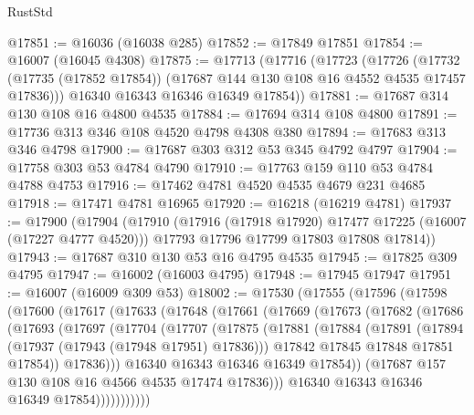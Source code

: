 \begin{lexlean}{RustStd}
\begin{coremodule}
@17851 := @16036 (@16038 @285)
@17852 := @17849 @17851
@17854 := @16007 (@16045 @4308)
@17875 := @17713
    (@17716
      (@17723
        (@17726
          (@17732 (@17735 (@17852 @17854)) (@17687 @144 @130 @108 @16 @4552 @4535 @17457 @17836)))
        @16340
        @16343
        @16346
        @16349
        @17854))
@17881 := @17687 @314 @130 @108 @16 @4800 @4535
@17884 := @17694 @314 @108 @4800
@17891 := @17736 @313 @346 @108 @4520 @4798 @4308 @380
@17894 := @17683 @313 @346 @4798
@17900 := @17687 @303 @312 @53 @345 @4792 @4797
@17904 := @17758 @303 @53 @4784 @4790
@17910 := @17763 @159 @110 @53 @4784 @4788 @4753
@17916 := @17462 @4781 @4520 @4535 @4679 @231 @4685
@17918 := @17471 @4781 @16965
@17920 := @16218 (@16219 @4781)
@17937 := @17900
    (@17904
      (@17910
        (@17916 (@17918 @17920) @17477 @17225 (@16007 (@17227 @4777 @4520)))
        @17793
        @17796
        @17799
        @17803
        @17808
        @17814))
@17943 := @17687 @310 @130 @53 @16 @4795 @4535
@17945 := @17825 @309 @4795
@17947 := @16002 (@16003 @4795)
@17948 := @17945 @17947
@17951 := @16007 (@16009 @309 @53)
@18002 := @17530
    (@17555
      (@17596
        (@17598
          (@17600
            (@17617
              (@17633
                (@17648
                  (@17661
                    (@17669
                      (@17673
                        (@17682
                          (@17686
                            (@17693
                              (@17697
                                (@17704
                                  (@17707
                                    (@17875
                                      (@17881
                                        (@17884
                                          (@17891
                                            (@17894 (@17937 (@17943 (@17948 @17951) @17836)))
                                            @17842
                                            @17845
                                            @17848
                                            @17851
                                            @17854))
                                        @17836)))
                                  @16340
                                  @16343
                                  @16346
                                  @16349
                                  @17854))
                              (@17687 @157 @130 @108 @16 @4566 @4535 @17474 @17836)))
                          @16340
                          @16343
                          @16346
                          @16349
                          @17854)))))))))))

\end{coremodule}
\end{lexlean}
